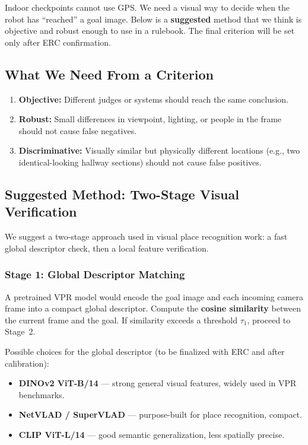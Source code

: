 \documentclass[11pt,a4paper]{article}
\begin{document}
Indoor checkpoints cannot use GPS. We need a visual way to decide when the robot has ``reached'' a goal image. Below is a \textbf{suggested} method that we think is objective and robust enough to use in a rulebook. The final criterion will be set only after ERC confirmation.

\subsection{What We Need From a Criterion}

\begin{enumerate}[nosep]
    \item \textbf{Objective:} Different judges or systems should reach the same conclusion.
    \item \textbf{Robust:} Small differences in viewpoint, lighting, or people in the frame should not cause false negatives.
    \item \textbf{Discriminative:} Visually similar but physically different locations (e.g., two identical-looking hallway sections) should not cause false positives.
\end{enumerate}

\subsection{Suggested Method: Two-Stage Visual Verification}

We suggest a two-stage approach used in visual place recognition work: a fast global descriptor check, then a local feature verification.

\subsubsection{Stage 1: Global Descriptor Matching}

A pretrained VPR model would encode the goal image and each incoming camera frame into a compact global descriptor. Compute the \textbf{cosine similarity} between the current frame and the goal. If similarity exceeds a threshold $\tau_1$, proceed to Stage~2.

Possible choices for the global descriptor (to be finalized with ERC and after calibration):

\begin{itemize}[nosep]
    \item \textbf{DINOv2 ViT-B/14} --- strong general visual features, widely used in VPR benchmarks.
    \item \textbf{NetVLAD / SuperVLAD} --- purpose-built for place recognition, compact.
    \item \textbf{CLIP ViT-L/14} --- good semantic generalization, less spatially precise.
\end{itemize}
\end{document}
